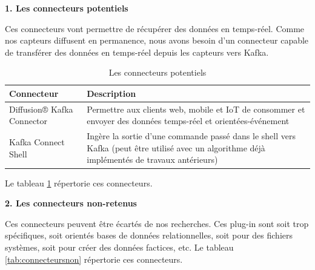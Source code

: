 \documentclass[11pt]{article}
\begin{document}
			\textbf{1. Les connecteurs potentiels}\par
			Ces connecteurs vont permettre de récupérer des données en temps-réel. 
			Comme nos capteurs diffusent en permanence, nous avons besoin d’un connecteur capable de transférer des données en temps-réel depuis les capteurs vers Kafka.
			\begin{table}[h]
				\begin{tabular}{|p{7.5cm}|p{7.5cm}|}
					\hline
					\rowcolor{lightgray} Connecteur & Description\\\hline
					Diffusion® Kafka Connector & Permettre aux clients web, mobile et IoT de consommer et envoyer des données temps-réel et orientées-événement\\\hline
					Kafka Connect Shell & Ingère la sortie d’une commande passé dans le shell vers Kafka (peut être utilisé avec un algorithme déjà implémentés de travaux antérieurs) \\\hline
				\end{tabular}
				\caption{Les connecteurs potentiels}
				\label{tab:potentiels}
			\end{table}
			Le tableau \ref{tab:potentiels} répertorie ces connecteurs.\par
			\textbf{2. Les connecteurs non-retenus}\par
			Ces connecteurs peuvent être écartés de nos recherches. 
			Ces plug-in sont soit trop spécifiques, soit orientés bases de données relationnelles, soit pour des fichiers systèmes, soit pour créer des données factices, etc.
			Le tableau \ref{tab:connecteursnon} répertorie ces connecteurs.
\end{document}
